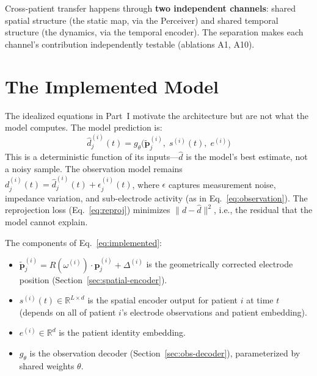 \documentclass[11pt,letterpaper]{article}
\newcommand{\bfp}{\mathbf{p}}
\newcommand{\R}{\mathbb{R}}
\begin{document}
\noindent Cross-patient transfer happens through \textbf{two independent channels}: shared spatial structure (the static map, via the Perceiver) and shared temporal structure (the dynamics, via the temporal encoder). The separation makes each channel's contribution independently testable (ablations A1, A10).


\section{The Implemented Model}\label{sec:implemented}

The idealized equations in Part~I motivate the architecture but are not what the model computes. The model prediction is:
\begin{equation}\label{eq:implemented}
\boxed{\hat{d}_j^{(i)}(t) = g_\theta\bigl(\tilde{\bfp}_j^{(i)},\; s^{(i)}(t),\; e^{(i)}\bigr)}
\end{equation}
This is a deterministic function of its inputs---$\hat{d}$ is the model's best estimate, not a noisy sample. The observation model remains $d_j^{(i)}(t) = \hat{d}_j^{(i)}(t) + \epsilon_j^{(i)}(t)$, where $\epsilon$ captures measurement noise, impedance variation, and sub-electrode activity (as in Eq.~\ref{eq:observation}). The reprojection loss (Eq.~\ref{eq:reproj}) minimizes $\|d - \hat{d}\|^2$, i.e., the residual that the model cannot explain.

\noindent The components of Eq.~\eqref{eq:implemented}:
\begin{itemize}[leftmargin=2em]
\item $\tilde{\bfp}_j^{(i)} = R(\omega^{(i)}) \cdot \bfp_j^{(i)} + \Delta^{(i)}$ is the geometrically corrected electrode position (Section~\ref{sec:spatial-encoder}).
\item $s^{(i)}(t) \in \R^{L \times d}$ is the spatial encoder output for patient $i$ at time $t$ (depends on all of patient $i$'s electrode observations and patient embedding).
\item $e^{(i)} \in \R^d$ is the patient identity embedding.
\item $g_\theta$ is the observation decoder (Section~\ref{sec:obs-decoder}), parameterized by shared weights $\theta$.
\end{itemize}
\end{document}
